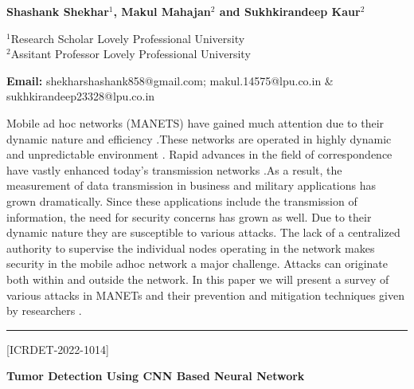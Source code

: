 \documentclass[twoside,11pt]{amsart}
\begin{document}
\centerline{\textbf{ Shashank Shekhar$^{1}$, Makul Mahajan$^{2}$ and  Sukhkirandeep Kaur$^{2}$ }}
\vskip 5mm
\begin{flushleft}
$^{1}$Research Scholar
Lovely Professional University
\\
$^{2}$Assitant Professor
Lovely Professional University
\vskip 5mm
\end{flushleft}
\vskip 2mm
\begin{flushleft}
{\bf Email:} shekharshashank858@gmail.com; makul.14575@lpu.co.in    \& sukhkirandeep23328@lpu.co.in
\end{flushleft}
\vskip 10mm
Mobile ad hoc networks (MANETS) have gained much attention due to their dynamic nature and efficiency .These networks are operated in highly dynamic and unpredictable  environment . Rapid advances in the field of correspondence have vastly enhanced today's transmission networks .As a result, the measurement of data transmission in business and military applications has grown dramatically. Since these applications include the transmission of information, the need for security concerns has grown as well. Due to their dynamic nature they are susceptible to various attacks.
\newpage
The lack of a centralized authority to supervise the individual nodes operating in the network makes security in the mobile adhoc network a major challenge. Attacks can originate both within and outside the network. In this paper we will present a survey of various attacks in MANETs and their prevention and mitigation techniques given by researchers .
\vskip 5mm
\rule{\textwidth}{0.5pt}
\vskip 5mm
\begin{flushleft}
\centerline{[ICRDET-2022-1014]}
\end{flushleft}
\begin{center}\bf\LARGE
Tumor Detection Using CNN Based Neural Network
\end{center}
\vskip 5mm
\end{document}
